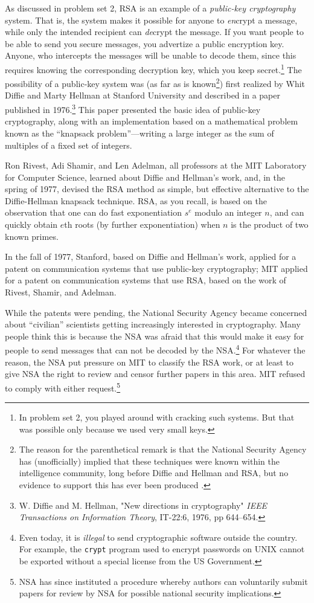 As discussed in problem set 2, RSA is an example of a {\it public-key
cryptography} system.  That is, the system makes it possible for
anyone to {\it en}crypt a message, while only the intended recipient
can {\it de}crypt the message.  If you want people to be able to send
you secure messages, you advertize a public encryption key.  Anyone,
who intercepts the messages will be unable to decode them, since this
requires knowing the corresponding decryption key, which you keep
secret.\footnote{In problem set 2, you played around with cracking
such systems.  But that was possible only because we used very small
keys.} The possibility of a public-key system was (as far as is
known\footnote{The reason for the parenthetical remark is that the
National Security Agency has (unofficially) implied that these
techniques were known within the intelligence community, long before
Diffie and Hellman and RSA, but no evidence to support this has ever
been produced .}) first realized by Whit Diffie and Marty Hellman at
Stanford University and described in a paper published in
1976.\footnote{W. Diffie and M. Hellman, "New directions in
cryptography" {\it IEEE Transactions on Information Theory}, IT-22:6,
1976, pp 644--654.} This paper presented the basic idea of public-key
cryptography, along with an implementation based on a mathematical
problem known as the ``knapsack problem''---writing a large integer as
the sum of multiples of a fixed set of integers.

Ron Rivest, Adi Shamir, and Len Adelman, all professors at the MIT
Laboratory for Computer Science, learned about Diffie and Hellman's
work, and, in the spring of 1977, devised the RSA method as simple,
but effective alternative to the Diffie-Hellman knapsack technique.
RSA, as you recall, is based on the observation that one can do fast
exponentiation $s^e$ modulo an integer $n$, and can quickly obtain
$e$th roots (by further exponentiation) when $n$ is the product of two
known primes.

In the fall of 1977, Stanford, based on Diffie and Hellman's work,
applied for a patent on communication systems that use public-key
cryptography; MIT applied for a patent on communication systems that
use RSA, based on the work of Rivest, Shamir, and Adelman.

While the patents were pending, the National Security Agency became
concerned about ``civilian'' scientists getting increasingly
interested in cryptography.  Many people think this is because the NSA
was afraid that this would make it easy for people to send messages
that can not be decoded by the NSA.\footnote{Even today, it is {\it
illegal} to send cryptographic software outside the country.  For
example, the {\tt crypt} program used to encrypt passwords on UNIX
cannot be exported without a special license from the US Government.}
For whatever the reason, the NSA put pressure on MIT to classify the
RSA work, or at least to give NSA the right to review and censor
further papers in this area.  MIT refused to comply with either
request.\footnote{NSA has since instituted a procedure whereby authors
can voluntarily submit papers for review by NSA for possible national
security implications.}

